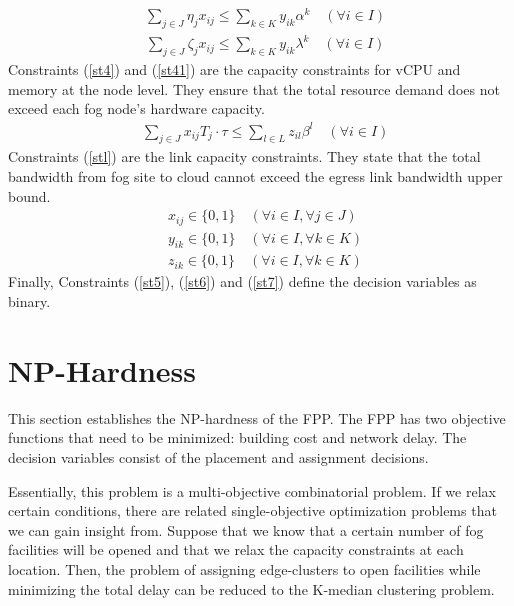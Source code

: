 \documentclass[10pt,journal,compsoc]{IEEEtran}
\newcommand{\Eq}[1]{(\ref{#1})}
\begin{document}
\begin{align}
&\sum_{j\in J} \eta_j x_{ij} \leq \sum_{k\in K} y_{ik}\alpha^k \quad(\forall i \in I)\label{st4}
\end{align}
\begin{align}
&\sum_{j\in J} \zeta_j x_{ij} \leq \sum_{k\in K} y_{ik}\lambda^k \quad(\forall i \in I)\label{st41}
\end{align}
Constraints \Eq{st4} and \Eq{st41} are the capacity constraints for vCPU and memory at the node level. They ensure that the total resource demand does not exceed each fog node's hardware capacity. 
\begin{align}
&\sum_{j\in J} x_{ij} T_j \cdot \tau \leq \sum_{l\in L} z_{il} \beta^l\quad(\forall i \in I) \label{stl}
\end{align}
Constraints \Eq{stl} are the link capacity constraints. They state that the total bandwidth from fog site to cloud cannot exceed the egress link bandwidth upper bound.\\
\begin{align}
&x_{ij} \in \{0,1\} \quad (\forall i \in I, \forall j \in J)\label{st5}\\
& y_{ik} \in \{0,1\} \quad (\forall i \in I, \forall k \in K)\label{st6}\\
& z_{ik} \in \{0,1\} \quad (\forall i \in I, \forall k \in K)\label{st7}
\end{align}
Finally, Constraints \Eq{st5}, \Eq{st6} and \Eq{st7} define the decision variables as binary.


\section{NP-Hardness}\label{nphard}
This section establishes the NP-hardness of the FPP.
The FPP has two objective functions that need to be minimized: building cost and network delay. The decision variables consist of the placement and assignment decisions. %

Essentially, this problem is a multi-objective combinatorial problem. If we relax certain conditions, there are related single-objective optimization problems that we can gain insight from.
Suppose that we know that a certain number of fog facilities will be opened and that we relax the capacity constraints at each location. Then, the problem of assigning edge-clusters to open facilities while minimizing the total delay can be reduced to the K-median clustering problem.
\end{document}
